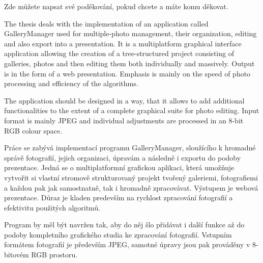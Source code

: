 \documentclass[11pt,twoside,a4paper]{book}
\begin{document}

\coverpagestarts


\acknowledgements
\noindent
Zde můžete napsat své poděkování, pokud chcete a máte komu děkovat.





 
\abstractpage
\noindent 
The thesis deals with the implementation of an application called GalleryManager used for multiple-photo management, their organization, editing and also export into a presentation. It is a multiplatform graphical interface application allowing the creation of a tree-structured project consisting of galleries, photos and then editing them both individually and massively. Output is in the form of a web presentation. Emphasis is mainly on the speed of photo processing and efficiency of the algorithms.

\indent 
The application should be designed in a way, that it allows to add additional functionalities to the extent of a complete graphical suite for photo editing. Input format is mainly JPEG and individual adjustments are processed in an 8-bit RGB colour space.


\baselineskip

\noindent 
Práce se zabývá implementací programu GalleryManager, sloužícího k hromadné správě fotografií, jejich organizaci, úpravám a následně i exportu do podoby prezentace. Jedná se o multiplatformní grafickou aplikaci, která umožňuje vytvořit si vlastní stromově strukturovaný projekt tvořený galeriemi, fotografiemi a každou pak jak samostnatně, tak i hromadně zpracovávat. Výstupem je webová prezentace. Důraz je kladen predevším na rychlost zpracování fotografií a efektivitu použitých algoritmů.

\indent 
Program by měl být navržen tak, aby do něj šlo přidávat i další funkce až do podoby kompletního grafického studia ke zpracování fotografií. Vstupním formátem fotografií je především JPEG, samotné úpravy jsou pak prováděny v 8-bitovém RGB prostoru.
\end{document}
